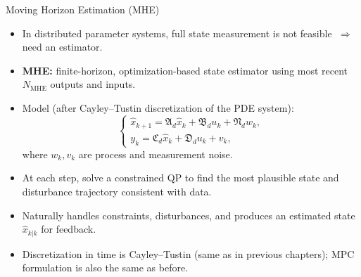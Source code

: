\documentclass[8pt]{beamer}
\begin{document}
\begin{frame}{Moving Horizon Estimation (MHE)}
\begin{itemize}
  \item In distributed parameter systems, full state measurement is not feasible $\;\Rightarrow\;$ need an estimator.
  \item \textbf{MHE:} finite-horizon, optimization-based state estimator using most recent $N_{\text{MHE}}$ outputs and inputs.
  \item Model (after Cayley--Tustin discretization of the PDE system):
  \[
  \begin{cases}
  \hat{x}_{k+1} = \mathfrak{A}_d \hat{x}_k + \mathfrak{B}_d u_k + \mathfrak{N}_d w_k, \\
  y_k = \mathfrak{C}_d \hat{x}_k + \mathfrak{D}_d u_k + v_k,
  \end{cases}
  \]
  where $w_k, v_k$ are process and measurement noise.
  \item At each step, solve a constrained QP to find the most plausible state and disturbance trajectory consistent with data.
  \item Naturally handles constraints, disturbances, and produces an estimated state $\hat{x}_{k|k}$ for feedback.
  \item Discretization in time is Cayley--Tustin (same as in previous chapters); MPC formulation is also the same as before.
\end{itemize}
\end{frame}
\end{document}
